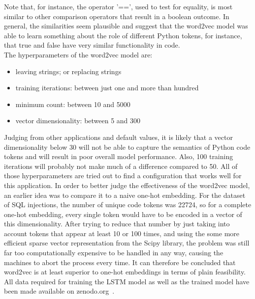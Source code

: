 \documentclass[
a4paper,
pagesize,
pdftex,
12pt,
ngerman,
fleqn,
final,
]{scrartcl}
\begin{document}
	Note that, for instance, the operator '==', used to test for equality, is most similar to other comparison operators that result in a boolean outcome. In general, the similarities seem plausible and suggest that the word2vec model was able to learn something about the role of different Python tokens, for instance, that true and false have very similar functionality in code.\\ 
	The hyperparameters of the word2vec model are:
	\begin{itemize}[noitemsep]
		\item leaving strings; or replacing strings
		\item training iterations: between just one and more than hundred
		\item minimum count: between 10 and 5000
		\item vector dimensionality: between 5 and 300
	\end{itemize}
	
	Judging from other applications and default values, it is likely that a vector dimensionality below 30 will not be able to capture the semantics of Python code tokens and will result in poor overall model performance. Also, 100 training iterations will probably not make much of a difference compared to 50. All of those hyperparameters are tried out to find a configuration that works well for this application.
	In order to better judge the effectiveness of the word2vec model, an earlier idea was to compare it to a naive one-hot embedding. For the dataset of SQL injections, the number of unique code tokens was 22724, so for a complete one-hot embedding, every single token would have to be encoded in a vector of this dimensionality. After trying to reduce that number by just taking into account tokens that appear at least 10 or 100 times, and using the some more efficient sparse vector representation from the Scipy library, the problem was still far too computationally expensive to be handled in any way, causing the machines to abort the process every time. It can therefore be concluded that word2vec is at least superior to one-hot embeddings in terms of plain feasibility.\\
	All data required for training the LSTM model as well as the trained model have been made available on zenodo.org~\cite{Wartschinski.2.12.2019,Wartschinski.2.12.2019c}.
	
	
	
\end{document}

